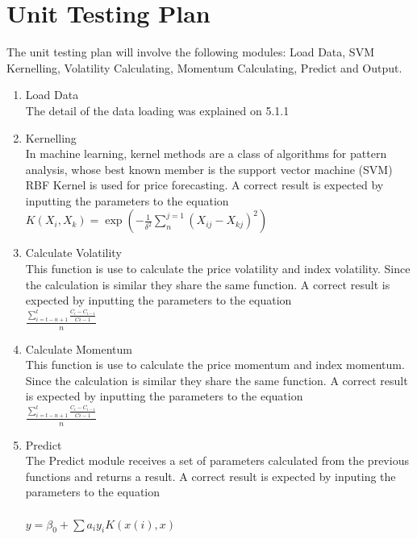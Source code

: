 \documentclass[12pt, titlepage]{article}
\begin{document}
\section{Unit Testing Plan}
The unit testing plan will involve the following modules: Load Data, SVM Kernelling, Volatility Calculating, Momentum Calculating, Predict and Output.\\
\begin{enumerate}

\item{ Load Data\\}
The detail of the data loading was explained on 5.1.1
\item{ Kernelling\\}
In machine learning, kernel methods are a class of algorithms for pattern analysis, whose best known member is the support vector machine (SVM)
RBF Kernel is used for price forecasting. A correct result is expected by inputting the parameters to the equation \\
$K\left (X_i,X_k\right )=\exp \left ( -\frac1{\delta^2}\sum_{n}^{j=1}(X_{ij}-X_{kj})^2 \right )$ \\

\item{ Calculate Volatility\\}
This function is use to calculate the price volatility and index volatility. Since the calculation is similar they share the same function. A correct result is expected by inputting the parameters to the equation \\
$\frac{\sum_{i=t-n+1}^{t} \frac{C_i-C_{i-1}}{C{i-1}}}{n}$ \\ 

\item{ Calculate Momentum\\}
This function is use to calculate the price momentum and index momentum. Since the calculation is similar they share the same function. A correct result is expected by inputting the parameters to the equation \\
$\frac{\sum_{i=t-n+1}^{t} \frac{C_i-C_{i-1}}{C{i-1}}}{n}$ \\ 

\item{Predict \\}
The Predict module receives a set of parameters calculated from the previous functions and returns a result. A correct result is expected by inputing the parameters to the equation \\\\
$y=\beta _0+\sum {a_iy_iK(x(i),x)}$\\

\end{enumerate} 
\end{document}
